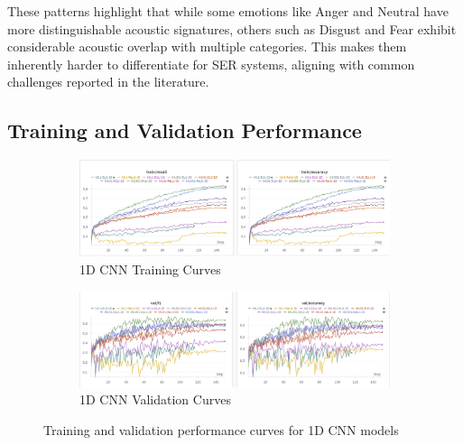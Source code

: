 These patterns highlight that while some emotions like Anger and Neutral have more distinguishable acoustic signatures, others such as Disgust and Fear exhibit considerable acoustic overlap with multiple categories. This makes them inherently harder to differentiate for SER systems, aligning with common challenges reported in the literature.

\subsection{Training and Validation Performance}

\begin{figure}[h]
    \centering
    \begin{subfigure}[b]{0.48\textwidth}
        \includegraphics[width=\textwidth]{1D/1d-train.png}
        \caption{1D CNN Training Curves}
    \end{subfigure}
    \hfill
    \begin{subfigure}[b]{0.48\textwidth}
        \includegraphics[width=\textwidth]{1D/1d-val.png}
        \caption{1D CNN Validation Curves}
    \end{subfigure}
    \caption{Training and validation performance curves for 1D CNN models}
    \label{fig:1d_training_curves}
\end{figure}

